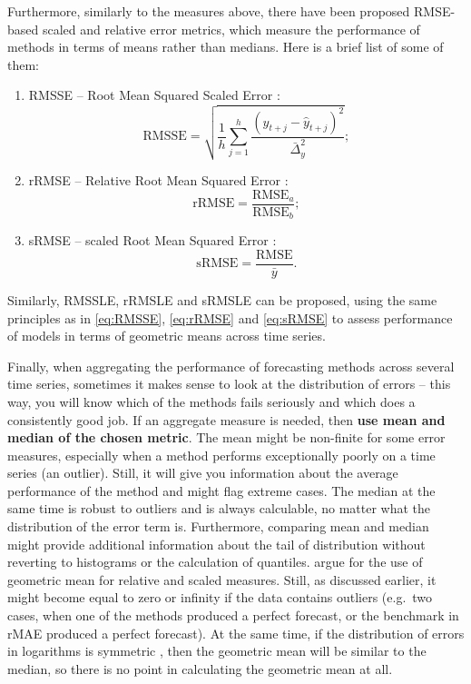 \documentclass[
]{book}
\providecommand{\tightlist}{%
  \setlength{\itemsep}{0pt}\setlength{\parskip}{0pt}}
\theoremstyle{definition}
\theoremstyle{definition}
\theoremstyle{definition}
\theoremstyle{definition}
\theoremstyle{remark}
\begin{document}
Furthermore, similarly to the measures above, there have been proposed RMSE-based scaled and relative error metrics, which measure the performance of methods in terms of means rather than medians. Here is a brief list of some of them:

\begin{enumerate}
\def\labelenumi{\arabic{enumi}.}
\tightlist
\item
  RMSSE -- Root Mean Squared Scaled Error \citep{Makridakis2020a}:
  \begin{equation}
   \mathrm{RMSSE} = \sqrt{\frac{1}{h} \sum_{j=1}^h \frac{(y_{t+j} -\hat{y}_{t+j})^2}{\bar{\Delta}_y^2}} ;
   \label{eq:RMSSE}
  \end{equation}
\item
  rRMSE -- Relative Root Mean Squared Error \citep{Stock2004}:
  \begin{equation}
   \mathrm{rRMSE} = \frac{\mathrm{RMSE}_a}{\mathrm{RMSE}_b} ;
   \label{eq:rRMSE}
  \end{equation}
\item
  sRMSE -- scaled Root Mean Squared Error \citep{Petropoulos2015}:
  \begin{equation}
   \mathrm{sRMSE} = \frac{\mathrm{RMSE}}{\bar{y}} .
   \label{eq:sRMSE}
  \end{equation}
\end{enumerate}

Similarly, RMSSLE, rRMSLE and sRMSLE can be proposed, using the same principles as in \eqref{eq:RMSSE}, \eqref{eq:rRMSE} and \eqref{eq:sRMSE} to assess performance of models in terms of geometric means across time series.

Finally, when aggregating the performance of forecasting methods across several time series, sometimes it makes sense to look at the distribution of errors -- this way, you will know which of the methods fails seriously and which does a consistently good job. If an aggregate measure is needed, then \textbf{use mean and median of the chosen metric}. The mean might be non-finite for some error measures, especially when a method performs exceptionally poorly on a time series (an outlier). Still, it will give you information about the average performance of the method and might flag extreme cases. The median at the same time is robust to outliers and is always calculable, no matter what the distribution of the error term is. Furthermore, comparing mean and median might provide additional information about the tail of distribution without reverting to histograms or the calculation of quantiles. \citet{Davydenko2013} argue for the use of geometric mean for relative and scaled measures. Still, as discussed earlier, it might become equal to zero or infinity if the data contains outliers (e.g.~two cases, when one of the methods produced a perfect forecast, or the benchmark in rMAE produced a perfect forecast). At the same time, if the distribution of errors in logarithms is symmetric \citep[which is the main argument of][]{Davydenko2013}, then the geometric mean will be similar to the median, so there is no point in calculating the geometric mean at all.
\end{document}
